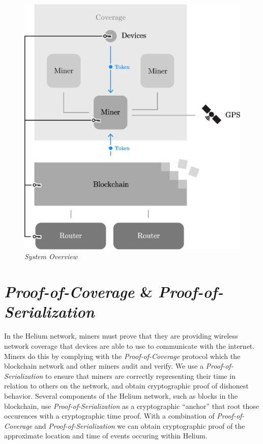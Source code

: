 \documentclass[letterpaper,11pt]{article}
\def\proofofcoverage/{\emph{Proof-of-Coverage}}
\begin{document}
\begin{figure}[H]
	\begin{center}
  		\includegraphics[width=\textwidth]{diagram1.eps}
  		\caption{\emph{System Overview}}
  		\label{fig:system}
 	\end{center}
\end{figure}

\newpage

\section{\proofofcoverage/ \& \emph{Proof-of-Serialization}}\label{poc}

In the Helium network, miners must prove that they are providing wireless network coverage that devices are able to use to communicate with the internet. Miners do this by complying with the \emph{Proof-of-Coverage} protocol which the blockchain network and other miners audit and verify. We use a \emph{Proof-of-Serialization} to ensure that miners are correctly representing their time in relation to others on the network, and obtain cryptographic proof of dishonest behavior. Several components of the Helium network, such as blocks in the blockchain, use \emph{Proof-of-Serialization} as a cryptographic ``anchor'' that root those occurences  with a cryptographic time proof. With a combination of \proofofcoverage/ and \emph{Proof-of-Serialization} we can obtain cryptographic proof of the approximate location and time of events occuring within Helium. \newline
\end{document}
